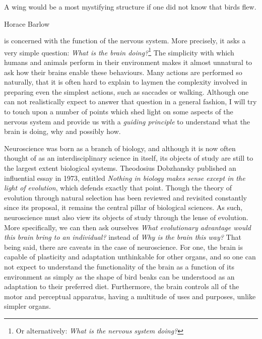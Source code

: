 \epigraph{A wing would be a most mystifying structure if one did not know that birds flew.}{Horace Barlow}

 is concerned with the function of the nervous system. More precisely, it asks a very simple question: {\em What is the brain 
doing?}\footnote{ Or alternatively: {\em What is the nervous system doing?}} The simplicity with which humans and animals perform in their environment makes it 
almost unnatural to ask how their brains enable these behaviours. Many actions are performed so naturally, that it is often hard to explain to laymen the complexity involved in 
preparing even the simplest actions, such as saccades or walking. Although one can not realistically expect to answer that question in a
general fashion, I will try to touch upon a number of points which shed light on some aspects of the nervous system and provide us with a {\em guiding principle} to 
understand what the brain is doing, why and possibly how.\par

Neuroscience was born as a branch of biology, and although it is now often thought of as  an interdisciplinary science in itself, its objects of study are still to the 
largest extent biological systems. Theodosius Dobzhansky published an influential essay in 1973, entitled {\em Nothing in biology makes sense except in the light of 
evolution}, which defends exactly that point. Though the theory of evolution through natural selection has been reviewed and revisited constantly since its proposal, it remains the central pillar of biological sciences. As such, neuroscience must also view its objects of study through the lense of evolution. 
More specifically, we can then ask ourselves {\em What evolutionary advantage would this brain bring to an individual?} instead of {\em Why is the brain this way?} 
That being said,  there are caveats in the case of neuroscience. For one, the brain is capable of plasticity and adaptation unthinkable for other organs, and so one can 
not expect to understand the functionality of the brain as a function of its environment as simply as the shape of bird beaks can be understood as an adaptation to their
preferred  diet. Furthermore, the brain controls all of the motor and perceptual apparatus, having a multitude of uses and purposes, unlike simpler organs.\par

